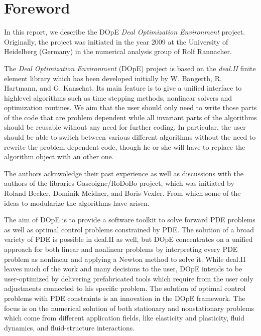 \chapter{Foreword}
In this report, we describe the DOpE
\textit{Deal Optimization Environment} project. 
Originally, the project was initiated in the year 2009 at the 
University of Heidelberg (Germany) in the numerical analysis
group of Rolf Rannacher. 

The \textit{Deal Optimization Environment} (DOpE) project is 
based on the \textit{deal.II} finite element library which has been developed
 initially by W. Bangerth, R. Hartmann, and G. Kanschat. 
Its main feature is to give a unified interface to highlevel algorithms such as 
time stepping methods, nonlinear solvers and optimization routines. 
We aim that the user should only need to write those parts
of the code that are problem dependent while all invariant parts of the algorithms
should be reusable without any need for further coding.
In particular, the user should be able to switch between various different 
algorithms without the need to rewrite the problem dependent code, though he or she will
have to replace the algorithm object with an other one. 

The authors acknwoledge their past experience as well as discussions with 
the authors of the libraries 
Gascoigne/RoDoBo project, which was initiated by 
Roland Becker, Dominik Meidner,  and Boris Vexler.  
From which some of the ideas to modularize the algorithms have arisen.

The aim of DOpE is to provide a software toolkit to solve forward PDE
problems as well as optimal control problems constrained by PDE. The
solution of a broad variety of PDE is possible in deal.II as well, but
DOpE concentrates on a unified approach for both linear and nonlinear
problems by interpreting every PDE problem as nonlinear and applying a
Newton method to solve it. While deal.II leaves much of the work and many
decisions to the user, DOpE intends to be user-optimized by delivering
prefabricated tools which require from the user only adjustments connected
to his specific problem. The solution of optimal control problems with PDE
constraints is an innovation in the DOpE framework.
The focus is on the numerical solution of both stationary and nonstationary
problems which come from different application fields, like elasticity and
plasticity, fluid dynamics, and fluid-structure interactions.

